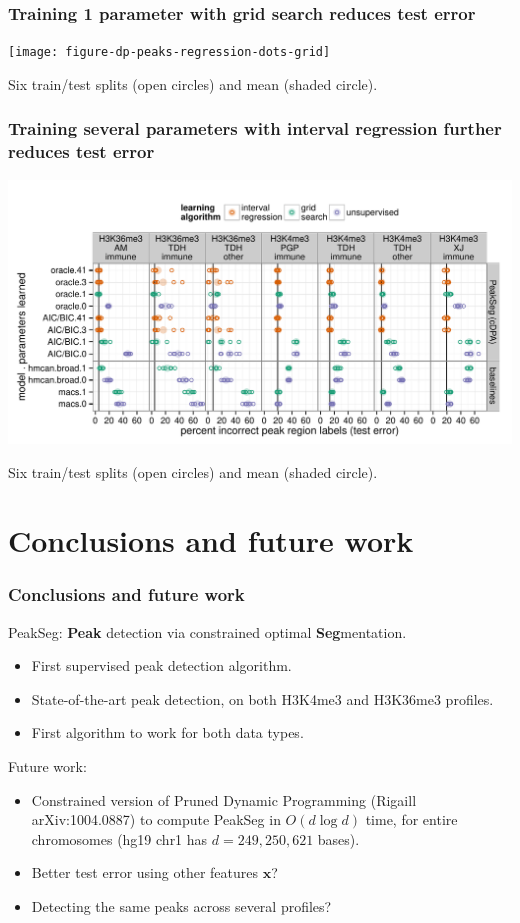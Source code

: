 \documentclass{beamer}
\begin{document}
\begin{frame}
  \frametitle{Training 1 parameter with grid search reduces test error}
  \texttt{[image: figure-dp-peaks-regression-dots-grid]}

  Six train/test splits (open circles) and mean (shaded circle).
\end{frame}

\begin{frame}
  \frametitle{Training several parameters with interval regression 
    further reduces test error}
  \includegraphics[width=\textwidth]{figure-dp-peaks-regression-dots}

  Six train/test splits (open circles) and mean (shaded circle).
\end{frame}

\section{Conclusions and future work}

\begin{frame}
  \frametitle{Conclusions and future work}
  PeakSeg: \textbf{Peak} detection via constrained optimal
  \textbf{Seg}mentation.
  \begin{itemize}
  \item First supervised peak detection algorithm.
  \item State-of-the-art peak detection, on both H3K4me3 and H3K36me3
    profiles.
  \item First algorithm to work for both data types.
  \end{itemize}
  Future work:
  \begin{itemize}
  \item Constrained version of Pruned Dynamic Programming (Rigaill
    arXiv:1004.0887) to compute PeakSeg in $O(d\log d)$ time, for
    entire chromosomes (hg19 chr1 has $d=249,250,621$ bases).
  \item Better test error using other features $\mathbf x$?
  \item Detecting the same peaks across several profiles?
  \end{itemize}
\end{frame}
\end{document}
